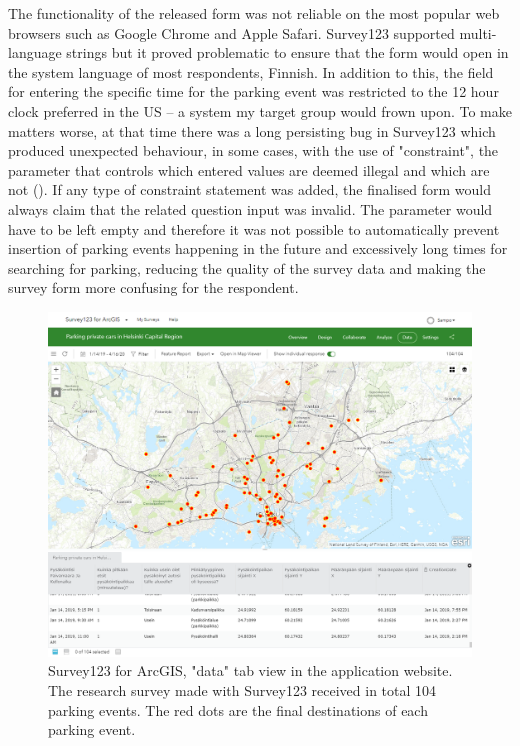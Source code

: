 The functionality of the released form was not reliable on the most popular web browsers such as Google Chrome and Apple Safari. Survey123 supported multi-language strings but it proved problematic to ensure that the form would open in the system language of most respondents, Finnish. In addition to this, the field for entering the specific time for the parking event was restricted to the 12 hour clock preferred in the US -- a system my target group would frown upon. To make matters worse, at that time there was a long persisting bug in Survey123 which produced unexpected behaviour, in some cases, with the use of "constraint", the parameter that controls which entered values are deemed illegal and which are not (\cite{GeoNet-TheEsriCommunity2018}). If any type of constraint statement was added, the finalised form would always claim that the related question input was invalid. The parameter would have to be left empty and therefore it was not possible to automatically prevent insertion of parking events happening in the future and excessively long times for searching for parking, reducing the quality of the survey data and making the survey form more confusing for the respondent.

\begin{figure}[H]%
    \includegraphics[width=\textwidth]{images/survey123_dataview.png}
    \caption[Survey123 data tab]{Survey123 for ArcGIS, "data" tab view in the application website. The research survey made with Survey123 received in total 104 parking events. The red dots are the final destinations of each parking event.}%
    \label{fig:survey123_dataview}%
\end{figure}

